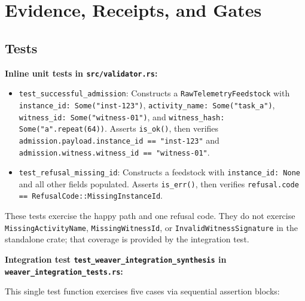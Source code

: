 
\section{Evidence, Receipts, and Gates}
\label{sec:otel-weaver-exp-003-live-check-to-refusal-evidence}

\subsection{Tests}
\label{sec:otel-weaver-exp-003-live-check-to-refusal-evidence-tests}

\textbf{Inline unit tests in \texttt{src/validator.rs}:}

\begin{itemize}
  \item \texttt{test\_successful\_admission}: Constructs a
        \texttt{RawTelemetryFeedstock} with \texttt{instance\_id: Some("inst-123")},
        \texttt{activity\_name: Some("task\_a")}, \texttt{witness\_id: Some("witness-01")},
        and \texttt{witness\_hash: Some("a".repeat(64))}. Asserts \texttt{is\_ok()},
        then verifies \texttt{admission.payload.instance\_id == "inst-123"} and
        \texttt{admission.witness.witness\_id == "witness-01"}.
  \item \texttt{test\_refusal\_missing\_id}: Constructs a feedstock with
        \texttt{instance\_id: None} and all other fields populated. Asserts
        \texttt{is\_err()}, then verifies
        \texttt{refusal.code == RefusalCode::MissingInstanceId}.
\end{itemize}

These tests exercise the happy path and one refusal code. They do not exercise
\texttt{MissingActivityName}, \texttt{MissingWitnessId}, or
\texttt{InvalidWitnessSignature} in the standalone crate; that coverage is provided
by the integration test.

\textbf{Integration test \texttt{test\_weaver\_integration\_synthesis}
in \texttt{weaver\_integration\_tests.rs}:}

This single test function exercises five cases via sequential assertion blocks:

